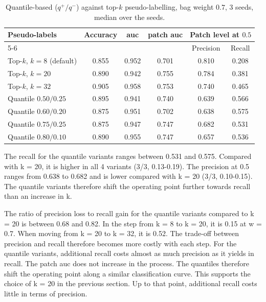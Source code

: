 \documentclass[12pt,parskip = half, DIV=classic,listof=totoc]{scrartcl}
\begin{document}
			\begin{table}[htbp]
				\centering
				\footnotesize
				\begin{tabular}{@{}lccccc@{}}
					\toprule
					\multirow{2}{*}{Pseudo-labels} & \multirow{2}{*}{Accuracy} & \multirow{2}{*}{\acs*{auc}} & \multirow{2}{*}{patch \acs*{auc}} & \multicolumn{2}{c}{Patch level at $0.5$} \\
					\cmidrule(l){5-6}
					& & & & Precision & Recall \\
					\midrule
					Top-$k$, $k=8$ (default) & 0.855 & 0.952 & 0.701 & 0.810 & 0.208 \\
					Top-$k$, $k=20$ & 0.890 & 0.942 & 0.755 & 0.784 & 0.381 \\
					Top-$k$, $k=32$ & 0.905 & 0.958 & 0.753 & 0.740 & 0.465 \\
					\midrule
					Quantile $0.50/0.25$ & 0.895 & 0.941 & 0.740 & 0.639 & 0.566 \\
					Quantile $0.60/0.20$ & 0.875 & 0.951 & 0.702 & 0.638 & 0.575 \\
					Quantile $0.75/0.25$ & 0.875 & 0.947 & 0.747 & 0.682 & 0.531 \\
					Quantile $0.80/0.10$ & 0.890 & 0.955 & 0.747 & 0.657 & 0.536 \\
					\bottomrule
				\end{tabular}
				\caption[Quantile-based ($q^{+}/q^{-}$) against top-$k$ pseudo-labelling, bag weight $0.7$, 3 seeds, median over the seeds]{Quantile-based ($q^{+}/q^{-}$) against top-$k$ pseudo-labelling, bag weight $0.7$, 3 seeds, median over the
				seeds.}
				\label{tab:clam_quantiles}
			\end{table}

			The recall for the quantile variants ranges between
			0.531 and 0.575. Compared with k = 20, it is higher in all 4 variants (3/3, 0.13-0.19). 
			The precision at 0.5 ranges from 0.638 to
			0.682 and is lower compared with k = 20 (3/3, 0.10-0.15). The
			quantile variants therefore shift the operating point further towards recall than an increase
			in k.

			The ratio of precision loss to recall gain for the
			quantile variants compared to k = 20 is between 0.68 and 0.82.
			In the step from k = 8 to k = 20, it is 0.15 at w = 0.7. When moving from
			k = 20 to k = 32, it is 0.52. The trade-off between precision and recall therefore becomes
			more costly with each step. For the quantile variants, additional recall costs almost
			as much precision as it yields in recall. The patch \ac{auc} does not increase in the process. 
			The quantiles therefore shift the operating point along a similar
			classification curve. This supports the choice of k = 20 in the previous section. Up to that point,
			additional recall costs little in terms of precision.
\end{document}
